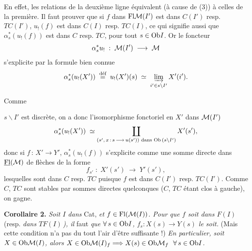 En effet, les relations de la deuxième ligne équivalent (à cause de (3)) à celles de la première. Il faut prouver que si $f$ dans $\mathrm{Fl}\mathcal{M}(I')$ est dans $C(I')$ resp. $TC(I')$, $u_{!}(f)$ est dans $C(I)$ resp. $TC(I)$, ce qui signifie aussi que $\alpha_s^*(u_{!}(f))$ est dans $C$ resp. $TC$, pour tout $s \in \mathrm{Ob} I$. Or le foncteur
\[
\alpha_s^* u_{!} \;:\; \mathcal{M}(I') \;\longrightarrow\; \mathcal{M}
\]
s'explicite par la formule bien connue
\[
\alpha_s^*(u_{!}(X')) \;\overset{\text{déf}}{=}\; u_{!}(X')(s) \;\simeq\; \mathop{\underrightarrow{\mathrm{lim}}}\limits_{i'\in s\backslash I'} X'(i').
\]

Comme

\noindent{}

\noindent $s\backslash I'$ est discrète, on a donc l'isomorphisme fonctoriel en $X'$ dans $\mathcal{M}(I')$
\[
\alpha_s^*(u_{!}(X')) \;\simeq \coprod_{(s',\, x \,:\, s \,\longrightarrow\, u(s')) \text{ dans } \mathrm{Ob}\,(s\backslash I')} X'(s'),
\]
donc si $f \,:\, X' \longrightarrow Y'$, $\alpha_s^*(u_{!}(f))$ s'explicite comme une somme directe dans $\underline{\mathrm{Fl}}(\mathcal{M})$ de flèches de la forme
\[
f_{s'} \;:\; X'(s') \;\longrightarrow\; Y'(s'),
\]
lesquelles sont dans $C$ resp. $TC$ puisque $f$ est dans $C(I')$ resp. $TC(I')$. Comme $C$, $TC$ sont stables par sommes directes quelconques ($C$, $TC$ étant clos à gauche), on gagne.

\textbf{Corollaire 2.} \textit{Soit $I$ dans} Cat, \textit{et $f \in \mathrm{Fl}(\mathcal{M}(I))$. Pour que $f$ soit dans $F(I)$} (resp. \textit{dans $TF(I)$\,), il} faut \textit{que $\forall\, s \in \mathrm{Ob} I$, $f_s : X(s) \longrightarrow Y(s)$ le soit.} (Mais cette condition n'a pas du tout l'air d'être suffisante !) \textit{En particulier, soit $X \in \mathrm{Ob}\mathcal{M}(I)$, alors $X \in \mathrm{Ob}\mathcal{M}(I)_f \Longrightarrow X(s) \in \mathrm{Ob}\mathcal{M}_f \ \ \forall\, s \in \mathrm{Ob} I$.}

